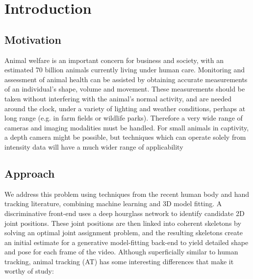 
\chapter{Introduction}  %

\ifpdf
    \graphicspath{{Chapter1/Figs/Raster/}{Chapter1/Figs/PDF/}{Chapter1/Figs/}}
\else
    \graphicspath{{Chapter1/Figs/Vector/}{Chapter1/Figs/}}
\fi


\section{Motivation} %

Animal welfare is an important concern for business and society, with an estimated 70 billion animals currently living under human care. Monitoring and
assessment of animal health can be assisted by obtaining accurate measurements
of an individual’s shape, volume and movement. These measurements should
be taken without interfering with the animal’s normal activity, and are needed
around the clock, under a variety of lighting and weather conditions, perhaps at
long range (e.g. in farm fields or wildlife parks). Therefore a very wide range of
cameras and imaging modalities must be handled. For small animals in captivity,
a depth camera might be possible, but techniques which can operate solely from
intensity data will have a much wider range of applicability

\section{Approach} %

We address this problem using techniques from the recent human body and
hand tracking literature, combining machine learning and 3D model fitting. A
discriminative front-end uses a deep hourglass network to identify candidate 2D
joint positions. These joint positions are then linked into coherent skeletons by
solving an optimal joint assignment problem, and the resulting skeletons create
an initial estimate for a generative model-fitting back-end to yield detailed shape
and pose for each frame of the video.
Although superficially similar to human tracking, animal tracking (AT) has
some interesting differences that make it worthy of study:


